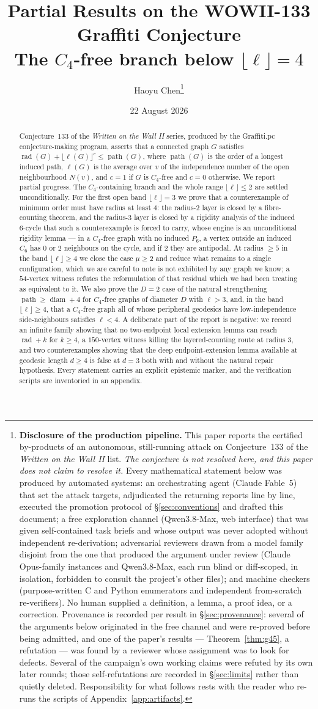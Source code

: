 \documentclass[11pt]{article}
\title{Partial Results on the WOWII-133 Graffiti Conjecture\\
{\large The $C_4$-free branch below $\lfloor \ell \rfloor = 4$}}
\author{Haoyu Chen\thanks{%
\textbf{Disclosure of the production pipeline.}
This paper reports the certified by-products of an autonomous, still-running attack on
Conjecture~133 of the \emph{Written on the Wall II} list. \emph{The conjecture is not
resolved here, and this paper does not claim to resolve it.} Every mathematical statement
below was produced by automated systems: an orchestrating agent (Claude Fable~5) that set
the attack targets, adjudicated the returning reports line by line, executed the promotion
protocol of \S\ref{sec:conventions} and drafted this document; a free exploration channel
(Qwen3.8-Max, web interface) that was given self-contained task briefs and whose output was
never adopted without independent re-derivation; adversarial reviewers drawn from a model
family disjoint from the one that produced the argument under review (Claude Opus-family
instances and Qwen3.8-Max, each run blind or diff-scoped, in isolation, forbidden to consult
the project's other files); and machine checkers (purpose-written C and Python enumerators
and independent from-scratch re-verifiers). No human supplied a definition, a lemma, a proof
idea, or a correction. Provenance is recorded per result in \S\ref{sec:provenance}: several
of the arguments below originated in the free channel and were re-proved before being
admitted, and one of the paper's results --- Theorem~\ref{thm:g45}, a refutation --- was
found by a reviewer whose assignment was to look for defects. Several of the campaign's own
working claims were refuted by its own later rounds; those self-refutations are recorded in
\S\ref{sec:limits} rather than quietly deleted. Responsibility for what follows rests with
the reader who re-runs the scripts of Appendix~\ref{app:artifacts}.}}
\date{22 August 2026}
\theoremstyle{plain}
\theoremstyle{definition}
\theoremstyle{remark}
\numberwithin{equation}{section}
\newcommand{\rad}{\operatorname{rad}}
\newcommand{\diam}{\operatorname{diam}}
\newcommand{\pth}{\operatorname{path}}
\begin{document}
\maketitle

\begin{abstract}
Conjecture~133 of the \emph{Written on the Wall II} series, produced by the Graffiti.pc
conjecture-making program, asserts that a connected graph $G$ satisfies
$\rad(G) + \lfloor \ell(G)\rfloor^{c} \le \pth(G)$, where $\pth(G)$ is the order of a
longest induced path, $\ell(G)$ is the average over $v$ of the independence number of the
open neighbourhood $N(v)$, and $c = 1$ if $G$ is $C_4$-free and $c = 0$ otherwise. We report
partial progress. The $C_4$-containing branch and the whole range $\lfloor \ell\rfloor \le 2$
are settled unconditionally. For the first open band $\lfloor \ell\rfloor = 3$ we prove that
a counterexample of minimum order must have radius at least $4$: the radius-$2$ layer is
closed by a fibre-counting theorem, and the radius-$3$ layer is closed by a rigidity
analysis of the induced $6$-cycle that such a counterexample is forced to carry, whose engine
is an unconditional rigidity lemma --- in a $C_4$-free graph with no induced $P_6$, a vertex
outside an induced $C_6$ has $0$ or $2$ neighbours on the cycle, and if $2$ they are
antipodal. At radius $\ge 5$ in the band $\lfloor \ell\rfloor \ge 4$ we close the case
$\mu \ge 2$ and reduce what remains to a single configuration, which we are careful to note
is not exhibited by any graph we know; a $54$-vertex witness refutes the reformulation of that
residual which we had been treating as equivalent to it. We also prove the $D = 2$ case of the
natural strengthening
$\pth \ge \diam + 4$ for $C_4$-free graphs of diameter $D$ with $\ell > 3$, and, in the band
$\lfloor \ell\rfloor \ge 4$, that a $C_4$-free graph all of whose peripheral geodesics have
low-independence side-neighbours satisfies $\ell < 4$. A deliberate part of the report is
negative: we record an infinite family showing that no two-endpoint local extension lemma
can reach $\rad + k$ for $k \ge 4$, a $150$-vertex witness killing the layered-counting route
at radius $3$, and two counterexamples showing that the deep endpoint-extension lemma
available at geodesic length $d \ge 4$ is false at $d = 3$ both with and without the natural
repair hypothesis. Every statement carries an explicit epistemic marker, and the verification
scripts are inventoried in an appendix.
\end{abstract}

\tableofcontents
\end{document}

